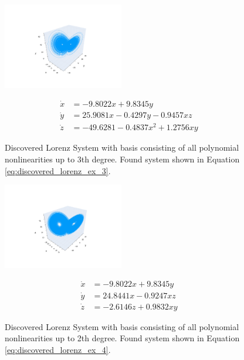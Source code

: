 \documentclass[10pt]{paper}
\begin{document}
\begin{figure}[H]
	\caption{Discovered Lorenz System with basis consisting of all polynomial nonlinearities up to 3th degree. Found system shown in Equation \ref{eq:discovered_lorenz_ex_3}.}
	\label{fig:found_lorenz_ex_3}

	\centering 
	\includegraphics[width = 0.47\textwidth, trim={4.3cm, 1.9cm, 4.3cm, 3.5cm}, clip]{lorenz_found_basis_ex_3.pdf}

	\begin{equation}\label{eq:discovered_lorenz_ex_3}
		\begin{split}
			\dot x &= -9.8022x + 9.8345y \\ 
			\dot y &= 25.9081x  -0.4297y  -0.9457xz \\
			\dot z &= -49.6281 -0.4837x^2 + 1.2756xy
		\end{split}
	\end{equation}
\end{figure}
\begin{figure}[H]
	\caption{Discovered Lorenz System with basis consisting of all polynomial nonlinearities up to 2th degree. Found system shown in Equation \ref{eq:discovered_lorenz_ex_4}.}
	\label{fig:found_lorenz_ex_4}

	\centering 
	\includegraphics[width = 0.47\textwidth, trim={4.3cm, 1.9cm, 4.3cm, 3.5cm}, clip]{lorenz_found_basis_ex_4.pdf}

	\begin{equation}\label{eq:discovered_lorenz_ex_4}
		\begin{split}
			\dot x &= -9.8022x + 9.8345y \\ 
			\dot y &= 24.8441x  -0.9247xz \\
			\dot z &= -2.6146z + 0.9832xy
		\end{split}
	\end{equation}
\end{figure}
\end{document}
